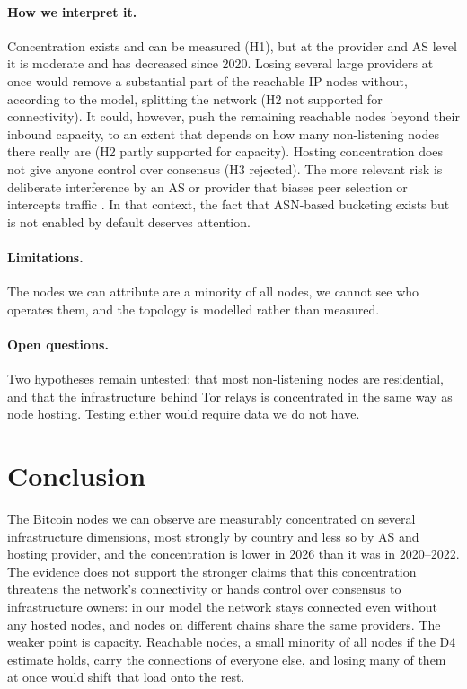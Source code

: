 \documentclass[10pt,a4paper]{article}
\begin{document}
\paragraph{How we interpret it.} Concentration exists and can be measured (H1), but at the provider and AS level it is moderate and has decreased since 2020. Losing several large providers at once would remove a substantial part of the reachable IP nodes without, according to the model, splitting the network (H2 not supported for connectivity). It could, however, push the remaining reachable nodes beyond their inbound capacity, to an extent that depends on how many non-listening nodes there really are (H2 partly supported for capacity). Hosting concentration does not give anyone control over consensus (H3 rejected). The more relevant risk is deliberate interference by an AS or provider that biases peer selection or intercepts traffic \cite{apostolaki2017hijacking,tran2020erebus}. In that context, the fact that ASN-based bucketing exists but is not enabled by default deserves attention.

\paragraph{Limitations.} The nodes we can attribute are a minority of all nodes, we cannot see who operates them, and the topology is modelled rather than measured.

\paragraph{Open questions.} Two hypotheses remain untested: that most non-listening nodes are residential, and that the infrastructure behind Tor relays is concentrated in the same way as node hosting. Testing either would require data we do not have.

\section{Conclusion}\label{sec:conclusion}

The Bitcoin nodes we can observe are measurably concentrated on several infrastructure dimensions, most strongly by country and less so by AS and hosting provider, and the concentration is lower in 2026 than it was in 2020--2022. The evidence does not support the stronger claims that this concentration threatens the network's connectivity or hands control over consensus to infrastructure owners: in our model the network stays connected even without any hosted nodes, and nodes on different chains share the same providers. The weaker point is capacity. Reachable nodes, a small minority of all nodes if the D4 estimate holds, carry the connections of everyone else, and losing many of them at once would shift that load onto the rest.
\end{document}
